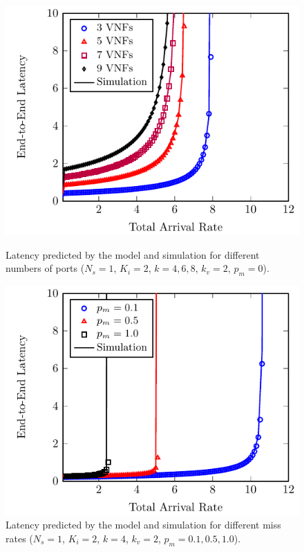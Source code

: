 
\begin{figure}
	\centering
	\begin{minipage}[b]{.49\textwidth}
		\includegraphics[width=\linewidth]{graphs/diff_lengths}
		\caption{Latency predicted by the model and simulation for different numbers
		of ports ($N_s=1$, $K_i=2$, $k={4,6,8}$, $k_v=2$, $p_m=0$).}
		\label{fig:num_ports}
	\end{minipage}
	\hfill
	\begin{minipage}[b]{.49\textwidth}
		\includegraphics[width=\linewidth]{graphs/diff_sdn}
		\caption{Latency predicted by the model and simulation for different miss rates ($N_s=1$, $K_i=2$, $k=4$, $k_v=2$, $p_m={0.1,0.5,1.0}$).}
		\label{fig:sdn_perc}
	\end{minipage}


\end{figure}

